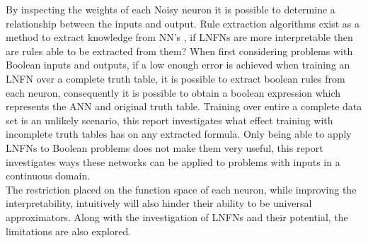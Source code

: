 By inspecting the weights of each Noisy neuron it is possible to determine a relationship between the inputs and output. Rule extraction algorithms exist as a method to extract knowledge from NN's \cite{andrews1995survey}, if LNFNs are more interpretable then are rules able to be extracted from them? When first considering problems with Boolean inputs and outputs, if a low enough error is achieved when training an LNFN over a complete truth table, it is possible to extract boolean rules from each neuron, consequently it is possible to obtain a boolean expression which represents the ANN and original truth table. Training over entire a complete data set is an unlikely scenario, this report investigates what effect training with incomplete truth tables has on any extracted formula. Only being able to apply LNFNs to Boolean problems does not make them very useful, this report investigates ways these networks can be applied to problems with inputs in a continuous domain.\\

The restriction placed on the function space of each neuron, while improving the interpretability, intuitively will also hinder their ability to be universal approximators. Along with the investigation of LNFNs and their potential, the limitations are also explored.

